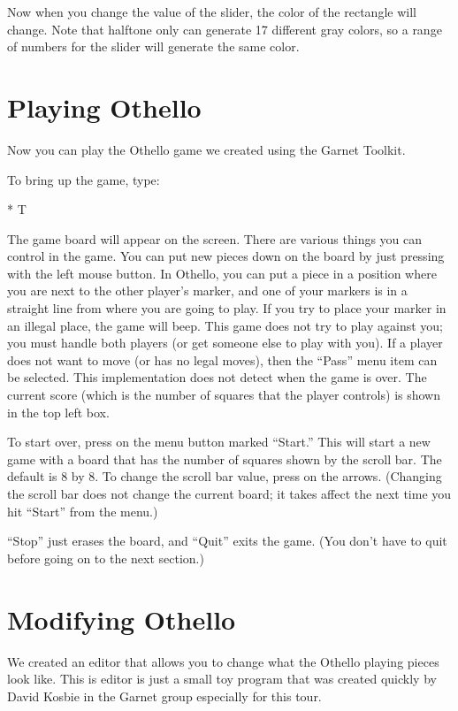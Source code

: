 Now when you change the value of the slider, the color of the rectangle
will change.  Note that halftone only can generate 17 different gray
colors, so a range of numbers for the slider will generate the same color.

\chapter{Playing Othello}
\label{Othello}

Now you can play the Othello game we created using the Garnet Toolkit.

To bring up the game, type:
\begin{programexample}
* 
T
\end{programexample}
The game board will appear on the
screen.  There are various things you can control in the game.  You can put
new pieces down on the board by just pressing with the left mouse button.
In Othello, you can put a piece in a position where you are next to the
other player's marker, and one of your markers is in a straight line from
where you are going to play.
If you try to place your marker in an illegal place, the
game will beep.  This game does not try to play against you; you must
handle both players (or get someone else to play with you).
If a player does not want to move (or has no legal moves), then the
``Pass'' menu item can be selected.  This implementation does not detect
when the game is over.  The current score (which is the number of squares
that the player controls) is shown in the top left box.

To start over, press on the menu button marked ``Start.''  This will start
a new game with a board that has the number of squares shown by the scroll
bar.  The default is 8 by 8.  To change the scroll bar value, press on the
arrows.  (Changing the scroll bar does not change the current board; it
takes affect the next time you hit ``Start'' from the menu.)

``Stop'' just erases the board, and ``Quit'' exits the game.  (You don't
have to quit before going on to the next section.)

\chapter{Modifying Othello}

We created an editor that allows you to change what the Othello playing
pieces look like.  This is editor is just a small toy program that was
created quickly by David Kosbie in the Garnet group especially for this tour.

